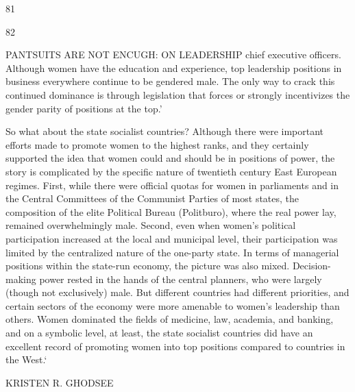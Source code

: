  \par 
81
 \par 
82
 \par 
PANTSUITS ARE NOT ENCUGH: ON LEADERSHIP chief executive officers. Although women have the education and experience, top leadership positions in business everywhere continue to be gendered male. The only way to crack this continued dominance is through legislation that forces or strongly incentivizes the gender parity of positions at the top.’
 \par 
So what about the state socialist countries? Although there were important efforts made to promote women to the highest ranks, and they certainly supported the idea that women could and should be in positions of power, the story is complicated by the specific nature of twentieth century East European regimes. First, while there were official quotas for women in parliaments and in the Central Committees of the Communist Parties of most states, the composition of the elite Political Bureau (Politburo), where the real power lay, remained overwhelmingly male. Second, even when women’s political participation increased at the local and municipal level, their participation was limited by the centralized nature of the one-party state. In terms of managerial positions within the state-run economy, the picture was also mixed. Decision-making power rested in the hands of the central planners, who were largely (though not exclusively) male. But different countries had different priorities, and certain sectors of the economy were more amenable to women’s leadership than others. Women dominated the fields of medicine, law, academia, and banking, and on a symbolic level, at least, the state socialist countries did have an excellent record of promoting women into top positions compared to countries in the West.‘
 \par 
KRISTEN R. GHODSEE
 \par 

